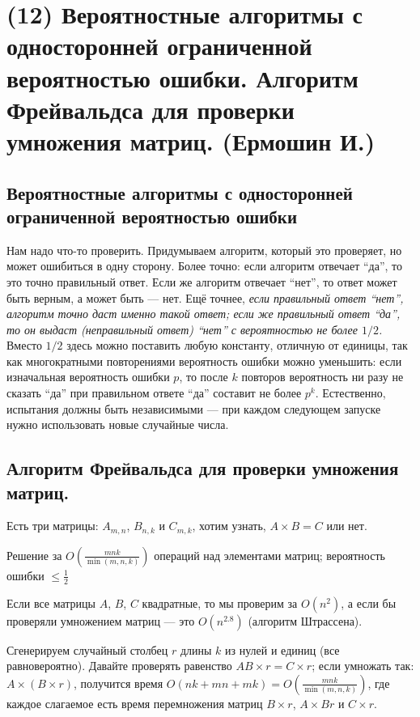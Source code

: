 \hypertarget{Freivalds}{}
\section{(12) Вероятностные алгоритмы с односторонней ограниченной вероятностью ошибки. Алгоритм Фрейвальдса для проверки умножения матриц. (Ермошин И.)}

\subsection{Вероятностные алгоритмы с односторонней ограниченной вероятностью ошибки}

Нам надо что-то проверить. Придумываем алгоритм, который это проверяет, но может ошибиться в одну сторону. Более точно: если алгоритм отвечает ``да'', то это точно правильный ответ. Если же алгоритм отвечает ``нет'', то ответ может быть верным, а может быть --- нет. Ещё точнее, \emph{если правильный ответ ``нет'', алгоритм точно даст именно такой ответ; если же правильный ответ ``да'', то он выдаст (неправильный ответ) ``нет'' с вероятностью не более $1/2$.} Вместо $1/2$ здесь можно поставить любую константу, отличную от единицы, так как многократными повторениями вероятность ошибки можно уменьшить: если изначальная вероятность ошибки  $p$, то после $k$ повторов вероятность ни разу не сказать ``да'' при правильном ответе ``да'' составит не более $p^k$. Естественно, испытания должны быть независимыми --- при каждом следующем запуске нужно использовать новые случайные числа.

\subsection{Алгоритм Фрейвальдса для проверки умножения матриц.}

Есть три матрицы: $A_{m,n}$, $B_{n,k}$ и $C_{m,k}$, хотим узнать, $A\times B=C$ или нет.

\begin{algodescription}{Решение за $O\left(\frac{mnk}{\min(m,n,k)}\right)$ операций над элементами матриц; вероятность ошибки $\le\frac{1}{2}$}

\begin{nb*}Если все матрицы $A$, $B$, $C$ квадратные, то мы проверим за $O(n^2)$, а если бы проверяли умножением матриц --- это $O(n^{2.8})$ (алгоритм Штрассена).
\end{nb*}

Сгенерируем случайный столбец $r$ длины $k$ из нулей и единиц (все равновероятно). Давайте проверять равенство $AB\times r=C\times r$; если умножать так: $A\times (B\times r)$, получится время $O(nk+mn+mk)=O\left(\frac{mnk}{\min(m,n,k)}\right)$, где каждое слагаемое есть время перемножения матриц $B\times r$, $A \times Br$ и $C\times r$.
\end{algodescription}

